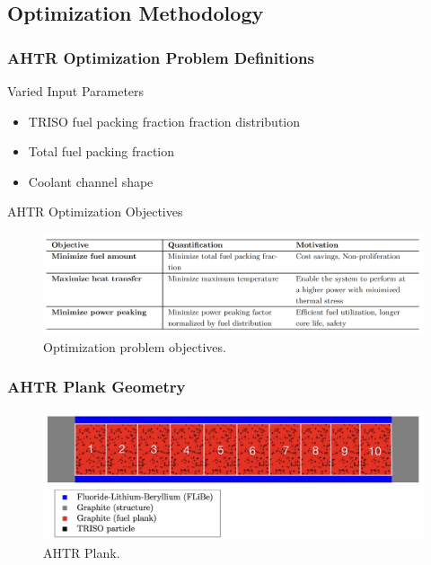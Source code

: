 \subsection{Optimization Methodology}
\begin{frame}
    \frametitle{AHTR Optimization Problem Definitions}
    \begin{block}{Varied Input Parameters}
        \begin{itemize}
            \item TRISO fuel packing fraction fraction distribution 
            \item Total fuel packing fraction 
            \item Coolant channel shape 
        \end{itemize}
    \end{block}
    \begin{block}{AHTR Optimization Objectives}
        \begin{figure}
            \includegraphics[width=0.9\linewidth]{figures/ahtr-opt-obj.png} 
            \caption{Optimization problem objectives.}
        \end{figure}
    \end{block}
\end{frame}

\begin{frame}
    \frametitle{AHTR Plank Geometry}
    \begin{figure}
        \includegraphics[width=0.9\linewidth]{figures/straightened-plank-pres.png} 
        \caption{AHTR Plank.}
    \end{figure}
\end{frame}

